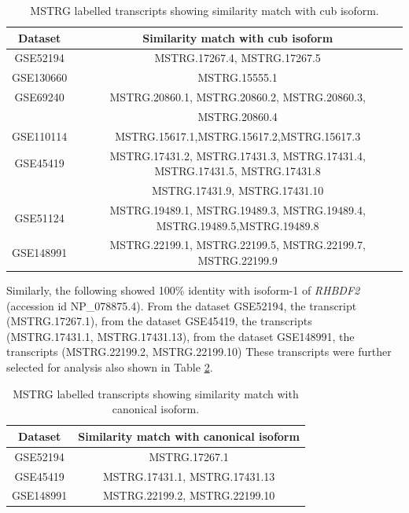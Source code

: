 \documentclass[fleqn,10pt,lineno]{wlpeerj}
\begin{document}
\begin{table}[ht]
\begin{center}
\begin{tabular}{ |c|c| } 
\hline
Dataset & Similarity match with cub isoform \\
\hline
GSE52194 & MSTRG.17267.4, MSTRG.17267.5 \\ 
\hline
GSE130660 & MSTRG.15555.1 \\
\hline
GSE69240 & MSTRG.20860.1, MSTRG.20860.2, MSTRG.20860.3, \\
& MSTRG.20860.4\\
\hline
GSE110114 & MSTRG.15617.1,MSTRG.15617.2,MSTRG.15617.3\\
\hline
GSE45419 & MSTRG.17431.2, MSTRG.17431.3, MSTRG.17431.4, MSTRG.17431.5, MSTRG.17431.8\\ 
& MSTRG.17431.9, MSTRG.17431.10\\
\hline
GSE51124 & MSTRG.19489.1, MSTRG.19489.3, MSTRG.19489.4, MSTRG.19489.5,MSTRG.19489.8\\
\hline
GSE148991 & MSTRG.22199.1, MSTRG.22199.5, MSTRG.22199.7, MSTRG.22199.9\\
\hline
\end{tabular}
\caption{\label{table1}MSTRG labelled transcripts showing similarity match with cub isoform.}
\end{center}
\end{table}

Similarly, the following showed 100\% identity with isoform-1 of \textit{RHBDF2} (accession id NP\_078875.4). From the dataset GSE52194, the transcript (MSTRG.17267.1), from the dataset GSE45419, the transcripts (MSTRG.17431.1, MSTRG.17431.13), from the dataset GSE148991, the transcripts (MSTRG.22199.2, MSTRG.22199.10) These transcripts were further selected for analysis also shown in Table \ref{table2}.

\begin{table}[ht]
\begin{center}
\begin{tabular}{ |c|c| } 
\hline
Dataset & Similarity match with canonical isoform \\
\hline
GSE52194 & MSTRG.17267.1 \\ 
\hline
GSE45419 & MSTRG.17431.1, MSTRG.17431.13 \\
\hline
GSE148991 & MSTRG.22199.2, MSTRG.22199.10 \\
\hline
\end{tabular}
\caption{\label{table2}MSTRG labelled transcripts showing similarity match with canonical isoform.}
\end{center}
\end{table}
\end{document}
